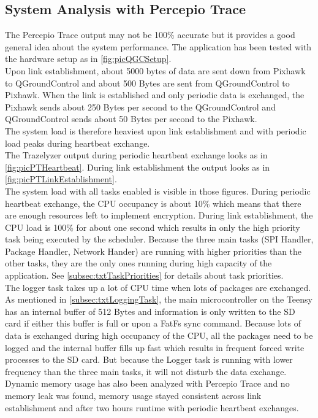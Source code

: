 \subsection{System Analysis with Percepio Trace} \label{subsec:txtPTSystemAnalysis}
The Percepio Trace output may not be 100\% accurate but it provides a good general idea about the system performance. The application has been tested with the hardware setup as in \autoref{fig:picQGCSetup}.\\
Upon link establishment, about 5000 bytes of data are sent down from Pixhawk to QGroundControl and about 500 Bytes are sent from QGroundControl to Pixhawk. When the link is established and only periodic data is exchanged, the Pixhawk sends about 250 Bytes per second to the QGroundControl and QGroundControl sends about 50 Bytes per second to the Pixhawk.\\
The system load is therefore heaviest upon link establishment and with periodic load peaks during heartbeat exchange.\\
The Trazelyzer output during periodic heartbeat exchange looks as in \autoref{fig:picPTHeartbeat}. During link establishment the output looks as in \autoref{fig:picPTLinkEstablishment}.\\
The system load with all tasks enabled is visible in those figures. During periodic heartbeat exchange, the CPU occupancy is about 10\% which means that there are enough resources left to implement encryption. During link establishment, the CPU load is 100\% for about one second which results in only the high priority task being executed by the scheduler. Because the three main tasks (SPI Handler, Package Handler, Network Hander) are running with higher priorities than the other tasks, they are the only ones running during high capacity of the application. See \autoref{subsec:txtTaskPriorities} for details about task priorities.\\
The logger task takes up a lot of CPU time when lots of packages are exchanged. As mentioned in \autoref{subsec:txtLoggingTask}, the main microcontroller on the Teensy has an internal buffer of 512 Bytes and information is only written to the SD card if either this buffer is full or upon a FatFs sync command. Because lots of data is exchanged during high occupancy of the CPU, all the packages need to be logged and the internal buffer fills up fast which results in frequent forced write processes to the SD card. But because the Logger task is running with lower frequency than the three main tasks, it will not disturb the data exchange.\\
Dynamic memory usage has also been analyzed with Percepio Trace and no memory leak was found, memory usage stayed consistent across link establishment and after two hours runtime with periodic heartbeat exchanges.
%
%
%
